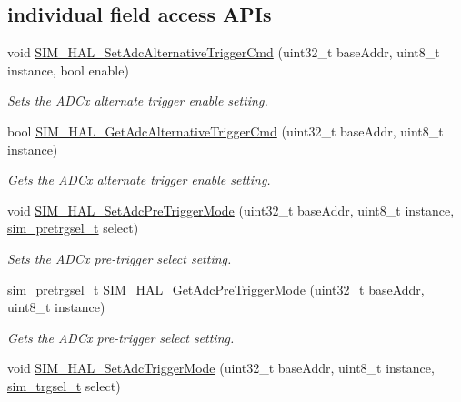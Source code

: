 \subsection*{individual field access A\+P\+Is}
\begin{DoxyCompactItemize}
\item 
void \hyperlink{group__sim__hal_ga15347a0602dc00a135252f4a2b856c67}{S\+I\+M\+\_\+\+H\+A\+L\+\_\+\+Set\+Adc\+Alternative\+Trigger\+Cmd} (uint32\+\_\+t base\+Addr, uint8\+\_\+t instance, bool enable)
\begin{DoxyCompactList}\small\item\em Sets the A\+D\+Cx alternate trigger enable setting. \end{DoxyCompactList}\item 
bool \hyperlink{group__sim__hal_ga49accc18a4a229a869a5101900963e29}{S\+I\+M\+\_\+\+H\+A\+L\+\_\+\+Get\+Adc\+Alternative\+Trigger\+Cmd} (uint32\+\_\+t base\+Addr, uint8\+\_\+t instance)
\begin{DoxyCompactList}\small\item\em Gets the A\+D\+Cx alternate trigger enable setting. \end{DoxyCompactList}\item 
void \hyperlink{group__sim__hal_gabdd025a72a84dc48bd14341843a8289d}{S\+I\+M\+\_\+\+H\+A\+L\+\_\+\+Set\+Adc\+Pre\+Trigger\+Mode} (uint32\+\_\+t base\+Addr, uint8\+\_\+t instance, \hyperlink{group__sim__hal_ga507a628a553fa85c2e2180012220d88e}{sim\+\_\+pretrgsel\+\_\+t} select)
\begin{DoxyCompactList}\small\item\em Sets the A\+D\+Cx pre-\/trigger select setting. \end{DoxyCompactList}\item 
\hyperlink{group__sim__hal_ga507a628a553fa85c2e2180012220d88e}{sim\+\_\+pretrgsel\+\_\+t} \hyperlink{group__sim__hal_gac7777699e1e0215e3d0937884c1b448a}{S\+I\+M\+\_\+\+H\+A\+L\+\_\+\+Get\+Adc\+Pre\+Trigger\+Mode} (uint32\+\_\+t base\+Addr, uint8\+\_\+t instance)
\begin{DoxyCompactList}\small\item\em Gets the A\+D\+Cx pre-\/trigger select setting. \end{DoxyCompactList}\item 
void \hyperlink{group__sim__hal_gab7e2e8a05d63b43ed81d89cdfebe7544}{S\+I\+M\+\_\+\+H\+A\+L\+\_\+\+Set\+Adc\+Trigger\+Mode} (uint32\+\_\+t base\+Addr, uint8\+\_\+t instance, \hyperlink{group__sim__hal_ga5bd34cf2c7d81265882d1b79534b43c0}{sim\+\_\+trgsel\+\_\+t} select)

\end{DoxyCompactItemize}
